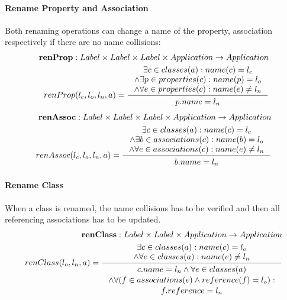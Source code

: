 \documentclass[11pt]{article}
\begin{document}
\paragraph{Rename Property and Association} Both renaming operations can change a name of the property, association respectively if there are no name collisions:
\begin{align*}
	\mathbf{renProp} : Label \times Label \times Label \times Application \rightarrow Application \\
	renProp(l_c, l_o, l_n, a) = \inference{\exists c \in classes(a) : name(c) = l_c \\ \wedge \exists p \in properties(c) : name(p) = l_o \\ \wedge \forall e \in properties(c) : name(e) \neq l_n
	}{\begin{gathered}
		p.name = l_n 
	\end{gathered}}
\end{align*}
\begin{align*}
	\mathbf{renAssoc} : Label \times Label \times Label \times Application \rightarrow Application \\
	renAssoc(l_c, l_o, l_n, a) = \inference{\exists c \in classes(a) : name(c) = l_c \\ \wedge \exists b \in associations(c) : name(b) = l_o \\ \wedge \forall e \in associations(c) : name(e) \neq l_n
	}{\begin{gathered}
		b.name = l_n 
	\end{gathered}}
\end{align*}

\paragraph{Rename Class} When a class is renamed, the name collisions has to be verified and then all referencing associations has to be updated.
\begin{align*}
	\mathbf{renClass} :  Label \times Label \times Application \rightarrow Application \\
	renClass(l_o, l_n, a) = \inference{\exists c \in classes(a) : name(c) = l_o \\ \wedge \forall e \in classes(a) : name(e) \neq l_n
	}{\begin{gathered}
		c.name = l_n \wedge \forall e \in classes(a) \\ \wedge \forall (f \in associations(e) \wedge reference(f) = l_o ) :\\ f.reference = l_n 
	\end{gathered}}
\end{align*}
\end{document}
